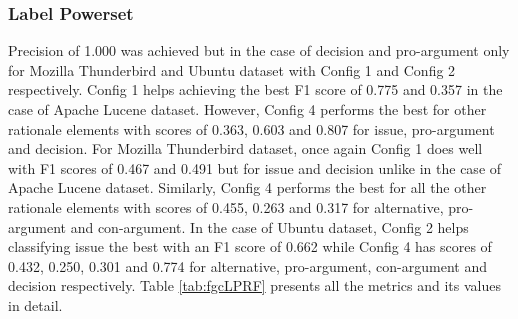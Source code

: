 \documentclass[a4paper,12pt,twoside]{report}
\begin{document}
\subsubsection{Label Powerset}
Precision of 1.000 was achieved but in the case of decision and pro-argument only for Mozilla Thunderbird and Ubuntu dataset with Config 1 and Config 2 respectively. Config 1 helps achieving the best F1 score of 0.775 and 0.357 in the case of Apache Lucene dataset. However, Config 4 performs the best for other rationale elements with scores of 0.363, 0.603 and 0.807 for issue, pro-argument and decision. For Mozilla Thunderbird dataset, once again Config 1 does well with F1 scores of 0.467 and 0.491 but for issue and decision unlike in the case of Apache Lucene dataset. Similarly, Config 4 performs the best for all the other rationale elements with scores of 0.455, 0.263 and 0.317 for alternative, pro-argument and con-argument. In the case of Ubuntu dataset, Config 2 helps classifying issue the best with an F1 score of 0.662 while Config 4 has scores of 0.432, 0.250, 0.301 and 0.774 for alternative, pro-argument, con-argument and decision respectively. Table \ref{tab:fgcLPRF} presents all the metrics and its values in detail.
\end{document}
